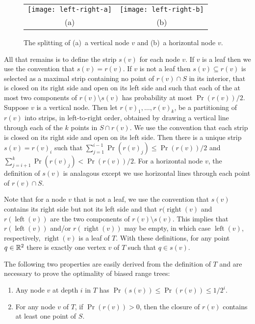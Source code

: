 \documentclass[charterfonts]{patmorin}
\DeclareMathOperator{\lft}{left}
\DeclareMathOperator{\rght}{right}
\begin{document}
\begin{figure}
  \begin{center}
    \begin{tabular}{cc}
      \texttt{[image: left-right-a]} & \texttt{[image: left-right-b]} \\
      (a) & (b)
    \end{tabular}
  \end{center}
  \caption{The splitting of (a)~a vertical node $v$ and (b)~a horizontal
  node $v$.}
\end{figure}

All that remains is to define the strip $s(v)$ for each node $v$. If
$v$ is a leaf then we use the convention that $s(v)=r(v)$.  If $v$ is
not a leaf then $s(v)\subseteq r(v)$ is selected as a maximal strip
containing no point of $r(v)\cap S$ in its interior, that is closed on
its right side and open on its left side and such that each of the at
most two components of $r(v)\setminus s(v)$ has probability at most
$\Pr(r(v))/2$.  Suppose $v$ is a vertical node.  Then let
$r(v)_1,\ldots,r(v)_k$, be a partitioning of $r(v)$ into strips, in
left-to-right order, obtained by drawing a vertical line through each
of the $k$ points in $S\cap r(v)$.  We use the convention that each
strip is closed on its right side and open on its left side.  Then
there is a unique strip $s(v)=r(v)_i$ such that $\sum_{j=1}^{i-1}
\Pr(r(v)_j) \le \Pr(r(v))/2$ and $\sum_{j=i+1}^{k} \Pr(r(v)_j) <
\Pr(r(v))/2$.  For a
horizontal node $v$, the definition of $s(v)$ is analagous except we
use horizontal lines through each point of $r(v)\cap S$.

Note that for a node $v$ that is not a leaf, we use the convention
that $s(v)$ contains its right side but not its left side and that
$r(\rght(v)$ and $r(\lft(v))$ are the two components of $r(v)\setminus
s(v)$.  This implies that $r(\lft(v))$ and/or $r(\rght(v))$ may be
empty, in which case $\lft(v)$, respectively, $\rght(v)$ is a leaf of
$T$.  With these definitions, for any point $q\in \mathbb{R}^2$ there is
exactly one vertex $v$ of $T$ such that $q\in s(v)$.

The following two properties are easily derived from the definition of
$T$ and are necessary to prove the optimality of biased range trees:
\begin{enumerate}

\item Any node $v$ at depth $i$ in $T$ has $\Pr(s(v))\le \Pr(r(v))\le 1/2^i$.

\item For any node $v$ of $T$, if $\Pr(r(v)) > 0$, then the closure of
$r(v)$ contains at least one point of $S$.
\end{enumerate}
\end{document}
